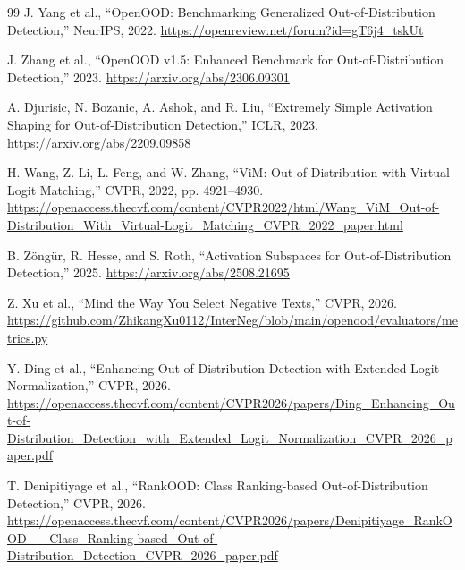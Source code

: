 \begin{thebibliography}{99}
J. Yang et al., ``OpenOOD: Benchmarking Generalized Out-of-Distribution
Detection,'' NeurIPS, 2022.
\url{https://openreview.net/forum?id=gT6j4_tskUt}

J. Zhang et al., ``OpenOOD v1.5: Enhanced Benchmark for
Out-of-Distribution Detection,'' 2023.
\url{https://arxiv.org/abs/2306.09301}

A. Djurisic, N. Bozanic, A. Ashok, and R. Liu,
``Extremely Simple Activation Shaping for Out-of-Distribution Detection,''
ICLR, 2023. \url{https://arxiv.org/abs/2209.09858}

H. Wang, Z. Li, L. Feng, and W. Zhang,
``ViM: Out-of-Distribution with Virtual-Logit Matching,''
CVPR, 2022, pp. 4921--4930.
\url{https://openaccess.thecvf.com/content/CVPR2022/html/Wang_ViM_Out-of-Distribution_With_Virtual-Logit_Matching_CVPR_2022_paper.html}

B. Z\"ong\"ur, R. Hesse, and S. Roth,
``Activation Subspaces for Out-of-Distribution Detection,'' 2025.
\url{https://arxiv.org/abs/2508.21695}

Z. Xu et al., ``Mind the Way You Select Negative Texts,'' CVPR, 2026.
\url{https://github.com/ZhikangXu0112/InterNeg/blob/main/openood/evaluators/metrics.py}

Y. Ding et al., ``Enhancing Out-of-Distribution Detection with Extended Logit
Normalization,'' CVPR, 2026.
\url{https://openaccess.thecvf.com/content/CVPR2026/papers/Ding_Enhancing_Out-of-Distribution_Detection_with_Extended_Logit_Normalization_CVPR_2026_paper.pdf}

T. Denipitiyage et al., ``RankOOD: Class Ranking-based Out-of-Distribution
Detection,'' CVPR, 2026.
\url{https://openaccess.thecvf.com/content/CVPR2026/papers/Denipitiyage_RankOOD_-_Class_Ranking-based_Out-of-Distribution_Detection_CVPR_2026_paper.pdf}

\end{thebibliography}
